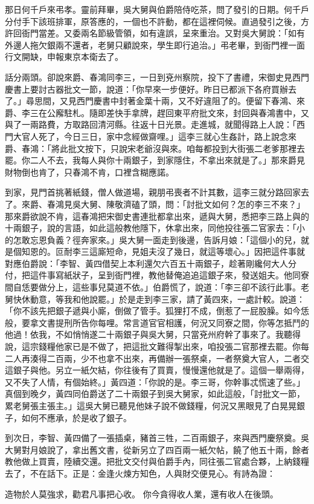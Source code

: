 那日何千戶來弔孝。靈前拜畢，吳大舅與伯爵陪侍吃茶，問了發引的日期。何千戶分付手下該班排軍，原答應的，一個也不許動，都在這裡伺候。直過發引之後，方許回衙門當差。又委兩名節級管領，如有違誤，呈來重治。又對吳大舅說：「如有外邊人拖欠銀兩不還者，老舅只顧說來，學生即行追治。」弔老畢，到衙門裡一面行文開缺，申報東京本衛去了。

話分兩頭。卻說來爵、春鴻同李三，一日到兗州察院，投下了書禮，宋御史見西門慶書上要討古器批文一節，說道：「你早來一步便好。昨日已都派下各府買辦去了。」尋思間，又見西門慶書中封著金葉十兩，又不好違阻了的。便留下春鴻、來爵、李三在公廨駐札。隨即差快手拿牌，趕回東平府批文來，封回與春鴻書中，又與了一兩路費，方取路回清河縣。往返十日光景。走進城，就聞得路上人說：「西門大官人死了，今日三日，家中念經做齋哩。」這李三就心生姦計，路上說念來爵、春鴻：「將此批文按下，只說宋老爺沒與來。咱每都投到大街張二老爹那裡去罷。你二人不去，我每人與你十兩銀子，到家隱住，不拿出來就是了。」那來爵見財物倒也肯了，只春鴻不肯，口裡含糊應諾。

到家，見門首挑著紙錢，僧人做道場，親朋弔喪者不計其數，這李三就分路回家去了。來爵、春鴻見吳大舅、陳敬濟磕了頭，問：「討批文如何？怎的李三不來？」 那來爵欲說不肯，這春鴻把宋御史書連批都拿出來，遞與大舅，悉把李三路上與的十兩銀子，說的言語，如此這般教他隱下，休拿出來，同他投往張二官家去：「小的怎敢忘恩負義？徑奔家來。」吳大舅一面走到後邊，告訴月娘：「這個小的兒，就是個知恩的。叵耐李三這廝短命，見姐夫沒了幾日，就這等壞心。」因把這件事就對應伯爵說：「李智、黃四借契上本利還欠六百五十兩銀子，趁著剛纔何大人分付，把這件事寫紙狀子，呈到衙門裡，教他替俺追追這銀子來，發送姐夫。他同寮間自恁要做分上，這些事兒莫道不依。」伯爵慌了，說道：「李三卻不該行此事。老舅快休動意，等我和他說罷。」於是走到李三家，請了黃四來，一處計較。說道：「你不該先把銀子遞與小廝，倒做了管手。狐狸打不成，倒惹了一屁股臊。如今恁般，要拿文書提刑所告你每哩。常言道官官相護，何況又同寮之間，你等怎抵鬥的他過！依我，不如悄悄遂二十兩銀子與吳大舅，只當兗州府幹了事來了。我聽得說，這宗錢糧他家已是不做了，把這批文難得掣出來，咱投張二官那裡去罷。你每二人再湊得二百兩，少不也拿不出來，再備辦一張祭桌，一者祭奠大官人，二者交這銀子與他。另立一紙欠結，你往後有了買賣，慢慢還他就是了。這個一舉兩得，又不失了人情，有個始終。」黃四道：「你說的是。李三哥，你幹事忒慌速了些。」真個到晚夕，黃四同伯爵送了二十兩銀子到吳大舅家，如此這般，「討批文一節，累老舅張主張主。」這吳大舅已聽見他妹子說不做錢糧，何況又黑眼見了白晃晃銀子，如何不應承，於是收了銀子。

到次日，李智、黃四備了一張插桌，豬首三牲，二百兩銀子，來與西門慶祭奠。吳大舅對月娘說了，拿出舊文書，從新另立了四百兩一紙欠帖，饒了他五十兩，餘者教他做上買賣，陸續交還。把批文交付與伯爵手內，同往張二官處合夥，上納錢糧去了，不在話下。正是：金逢火煉方知色，人與財交便見心。有詩為證：

造物於人莫強求，勸君凡事把心收。
你今貪得收人業，還有收人在後頭。

